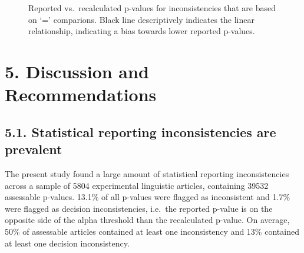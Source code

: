 \documentclass[
  doc,
  longtable,
  nolmodern,
  notxfonts,
  notimes,
  colorlinks=true,linkcolor=blue,citecolor=blue,urlcolor=blue]{apa7}
\begin{document}
\begin{figure}

\caption{\label{fig-scatter}Reported vs.~recalculated p-values for
inconsistencies that are based on `=' comparions. Black line
descriptively indicates the linear relationship, indicating a bias
towards lower reported p-values.}


\end{figure}%

\section{5. Discussion and
Recommendations}\label{discussion-and-recommendations}

\subsection{5.1. Statistical reporting inconsistencies are
prevalent}\label{statistical-reporting-inconsistencies-are-prevalent}

The present study found a large amount of statistical reporting
inconsistencies across a sample of 5804 experimental linguistic
articles, containing 39532 assessable p-values. 13.1\% of all p-values
were flagged as inconsistent and 1.7\% were flagged as decision
inconsistencies, i.e.~the reported p-value is on the opposite side of
the alpha threshold than the recalculated p-value. On average, 50\% of
assessable articles contained at least one inconsistency and 13\%
contained at least one decision inconsistency.
\end{document}
